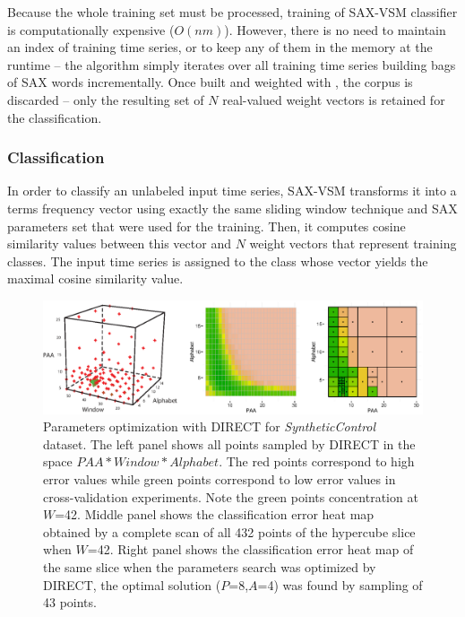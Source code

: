 Because the whole training set must be processed, training of SAX-VSM classifier is computationally 
expensive ($O(nm)$). However, there is no need to maintain an index of training time series, or to keep any 
of them in the memory at the runtime -- the algorithm simply iterates over all training time series building 
bags of SAX words incrementally. Once built and weighted with \tfidf, the corpus is discarded -- only the
resulting set of $N$ real-valued weight vectors is retained for the classification.

\subsubsection{Classification}
In order to classify an unlabeled input time series, SAX-VSM transforms it into a terms frequency vector using 
exactly the same sliding window technique and SAX parameters set that were used for the training. 
Then, it computes cosine similarity values between this vector and $N$ \tfidf weight vectors that represent 
training classes. The input time series is assigned to the class whose vector yields the maximal cosine 
similarity value.

\begin{figure}[t]
   \centering
   \includegraphics[width=150mm]{figures/figure_direct.eps}
   \caption{Parameters optimization with DIRECT for \textit{SyntheticControl} dataset. 
   The left panel shows all points sampled by DIRECT in the space \mbox{$PAA*Window*Alphabet$}.
   The red points correspond to high error values while green points correspond to low error values 
   in cross-validation experiments. 
   Note the green points concentration at $W$=42. 
   Middle panel shows the classification error heat map obtained by a complete scan 
   of all 432 points of the hypercube slice when $W$=42. 
   Right panel shows the classification error heat map of the same slice when 
   the parameters search was optimized by DIRECT, 
   the optimal solution ($P$=8,$A$=4) was found by sampling of 43 points.}
   \label{fig:direct-sampling}
\end{figure}


